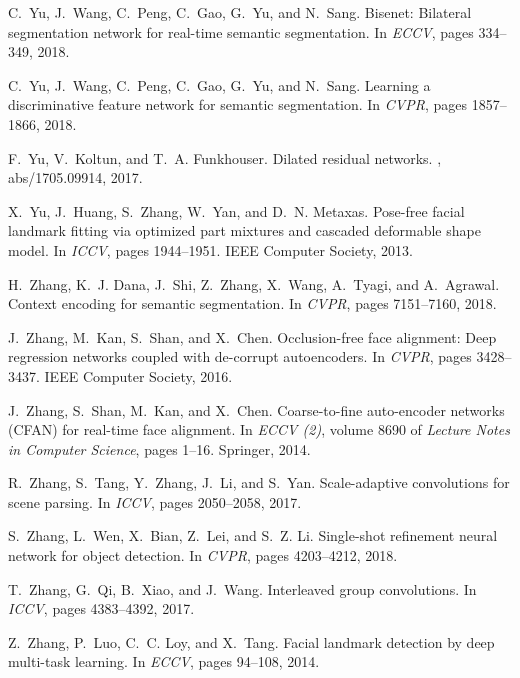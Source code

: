 \documentclass[10pt,twocolumn,letterpaper]{article}
\begin{document}
{\begin{thebibliography}{100}
C.~Yu, J.~Wang, C.~Peng, C.~Gao, G.~Yu, and N.~Sang.
\newblock Bisenet: Bilateral segmentation network for real-time semantic
  segmentation.
\newblock In {\em {ECCV}}, pages 334--349, 2018.

C.~Yu, J.~Wang, C.~Peng, C.~Gao, G.~Yu, and N.~Sang.
\newblock Learning a discriminative feature network for semantic segmentation.
\newblock In {\em {CVPR}}, pages 1857--1866, 2018.

F.~Yu, V.~Koltun, and T.~A. Funkhouser.
\newblock Dilated residual networks.
, abs/1705.09914, 2017.

X.~Yu, J.~Huang, S.~Zhang, W.~Yan, and D.~N. Metaxas.
\newblock Pose-free facial landmark fitting via optimized part mixtures and
  cascaded deformable shape model.
\newblock In {\em {ICCV}}, pages 1944--1951. {IEEE} Computer Society, 2013.

H.~Zhang, K.~J. Dana, J.~Shi, Z.~Zhang, X.~Wang, A.~Tyagi, and A.~Agrawal.
\newblock Context encoding for semantic segmentation.
\newblock In {\em {CVPR}}, pages 7151--7160, 2018.

J.~Zhang, M.~Kan, S.~Shan, and X.~Chen.
\newblock Occlusion-free face alignment: Deep regression networks coupled with
  de-corrupt autoencoders.
\newblock In {\em {CVPR}}, pages 3428--3437. {IEEE} Computer Society, 2016.

J.~Zhang, S.~Shan, M.~Kan, and X.~Chen.
\newblock Coarse-to-fine auto-encoder networks {(CFAN)} for real-time face
  alignment.
\newblock In {\em {ECCV} {(2)}}, volume 8690 of {\em Lecture Notes in Computer
  Science}, pages 1--16. Springer, 2014.

R.~Zhang, S.~Tang, Y.~Zhang, J.~Li, and S.~Yan.
\newblock Scale-adaptive convolutions for scene parsing.
\newblock In {\em {ICCV}}, pages 2050--2058, 2017.

S.~Zhang, L.~Wen, X.~Bian, Z.~Lei, and S.~Z. Li.
\newblock Single-shot refinement neural network for object detection.
\newblock In {\em {CVPR}}, pages 4203--4212, 2018.

T.~Zhang, G.~Qi, B.~Xiao, and J.~Wang.
\newblock Interleaved group convolutions.
\newblock In {\em {ICCV}}, pages 4383--4392, 2017.

Z.~Zhang, P.~Luo, C.~C. Loy, and X.~Tang.
\newblock Facial landmark detection by deep multi-task learning.
\newblock In {\em {ECCV}}, pages 94--108, 2014.


\end{thebibliography}}
\end{document}
